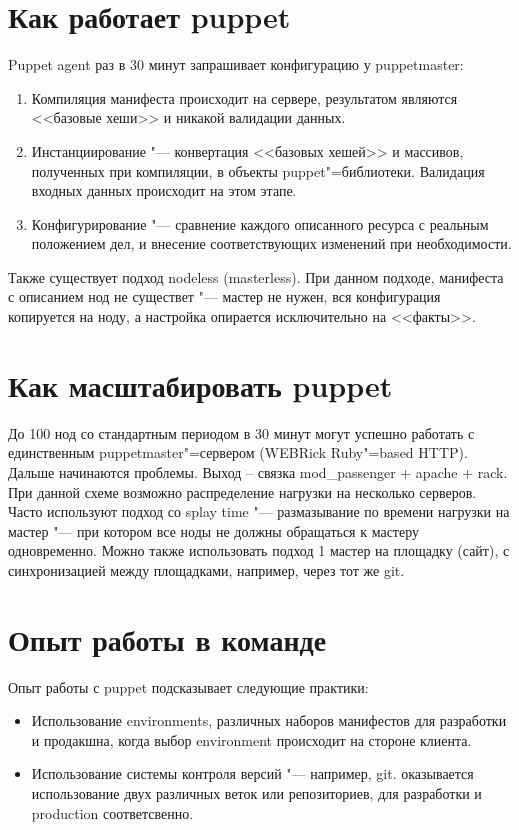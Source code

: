 \documentclass[10pt, a5paper]{article}
\begin{document}
\section*{Как работает puppet}

Puppet agent раз в 30 минут запрашивает конфигурацию \linebreak у puppetmaster:

\begin{enumerate}
  \item Компиляция манифеста происходит на сервере, результатом являются <<базовые хеши>> и никакой валидации данных.
  \item Инстанциирование "--- конвертация <<базовых хешей>> и массивов, полученных при компиляции, в объекты puppet"=библиотеки. Валидация входных данных происходит на этом этапе.
  \item Конфигурирование "--- сравнение каждого описанного ресурса с реальным положением дел, и внесение соответствующих изменений при необходимости.
\end{enumerate}

Также существует подход nodeless (masterless). При данном подходе, манифеста с описанием нод не существет "--- мастер не нужен, вся конфигурация копируется на ноду, а настройка опирается исключительно на <<факты>>.

\section*{Как масштабировать puppet}

До 100 нод со стандартным периодом в 30 минут могут успешно работать с единственным puppetmaster"=сервером (WEBRick Ruby"=based HTTP). Дальше начинаются проблемы. Выход -- связка mod\_passenger + apache + rack. При данной схеме возможно распределение нагрузки на несколько серверов. Часто используют подход со splay time "--- размазывание по времени нагрузки на мастер "--- при котором все ноды не должны обращаться к мастеру одновременно. Можно также использовать подход 1 мастер на площадку (сайт), с синхронизацией между площадками, например, через тот же git.

\section*{Опыт работы в команде}

Опыт работы с puppet подсказывает следующие практики:

\begin{itemize}
  \item Использование environments, различных наборов манифестов для разработки и продакшна, когда выбор environment происходит на стороне клиента.
  \item Использование системы контроля версий "--- например, git.  оказывается использование двух различных веток или репозиториев, для разработки и production соответсвенно.
\end{itemize}
\end{document}
